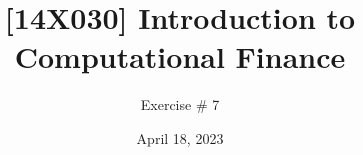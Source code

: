 \documentclass[12pt]{article}
\title{[14X030] Introduction to Computational Finance}
\author{Exercise \# 7}
\date{\small April 18, 2023}
\begin{document}
 

\maketitle 




\vfill



\vfill
\end{document}
